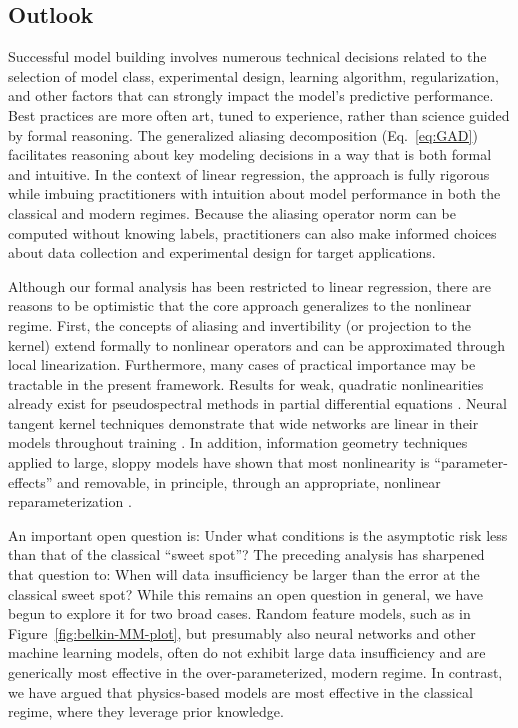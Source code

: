 \documentclass[twocolumn,aps,prx,superscriptaddress,10pt]{revtex4-2}
\newcommand{\0}{\bm{0}}
\begin{document}
\subsection{Outlook}
\label{sec:outlook}

Successful model building involves numerous technical decisions related to the selection of model class, experimental design, learning algorithm, regularization, and other factors that can strongly impact the model's predictive performance.
Best practices are more often art, tuned to experience, rather than science guided by formal reasoning.
The generalized aliasing decomposition (Eq.~\eqref{eq:GAD}) facilitates reasoning about key modeling decisions in a way that is both formal and intuitive.
In the context of linear regression, the approach is fully rigorous while imbuing practitioners with intuition about model performance in both the classical and modern regimes.
Because the aliasing operator norm can be computed without knowing labels, practitioners can also make informed choices about data collection and experimental design for target applications.

Although our formal analysis has been restricted to linear regression, there are reasons to be optimistic that the core approach generalizes to the nonlinear regime.
First, the concepts of aliasing and invertibility (or projection to the kernel) extend formally to nonlinear operators and can be approximated through local linearization.
Furthermore, many cases of practical importance may be tractable in the present framework.
Results for weak, quadratic nonlinearities already exist for pseudospectral methods in partial differential equations \cite{orszag1971elimination}.
Neural tangent kernel techniques demonstrate that wide networks are linear in their models throughout training \cite{lee2020wide}.
In addition, information geometry techniques applied to large, sloppy models have shown that most nonlinearity is ``parameter-effects'' and removable, in principle, through an appropriate, nonlinear reparameterization \cite{transtrum2011geometry}.

An important open question is: Under what conditions is the asymptotic risk less than that of the classical ``sweet spot''?
The preceding analysis has sharpened that question to: When will data insufficiency be larger than the error at the classical sweet spot?
While this remains an open question in general, we have begun to explore it for two broad cases.  
Random feature models, such as in Figure~\ref{fig:belkin-MM-plot}, but presumably also neural networks and other machine learning models, often do not exhibit large data insufficiency and are generically most effective in the over-parameterized, modern regime.
In contrast, we have argued that physics-based models are most effective in the classical regime, where they leverage prior knowledge.
\end{document}
